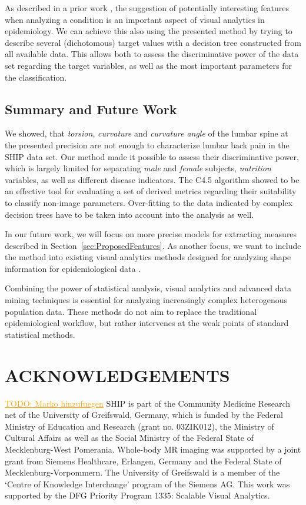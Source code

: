 \documentclass[a4paper,twoside]{style/article}
\newcommand{\com}[1]{\textcolor{orange}{\uline{#1}}}
\begin{document}
As described in a prior work \cite{Klemm2014VIS}, the suggestion of potentially interesting features when analyzing a condition is an important aspect of visual analytics in epidemiology.
We can achieve this also using the presented method by trying to describe several (dichotomous) target values with a decision tree constructed from all available data.
This allows both to assess the discriminative power of the data set regarding the target variables, as well as the most important parameters for the classification.

\subsection{Summary and Future Work}
\noindent We showed, that \emph{torsion}, \emph{curvature} and \emph{curvature angle} of the lumbar spine at the presented precision are not enough to characterize lumbar back pain in the SHIP data set.
Our method made it possible to assess their discriminative power, which is largely limited for separating \emph{male} and \emph{female} subjects, \emph{nutrition} variables, as well as different disease indicators.
The C4.5 algorithm showed to be an effective tool for evaluating a set of derived metrics regarding their suitability to classify non-image parameters.
Over-fitting to the data indicated by complex decision trees have to be taken into account into the analysis as well.

In our future work, we will focus on more precise models for extracting measures described in Section~\ref{sec:ProposedFeatures}.
As another focus, we want to include the method into existing visual analytics methods designed for analyzing shape information for epidemiological data \cite{Klemm2014VIS}.

Combining the power of statistical analysis, visual analytics and advanced data mining techniques is essential for analyzing increasingly complex heterogenous population data.
These methods do not aim to replace the traditional epidemiological workflow, but rather intervenes at the weak points of standard statistical methods.

\section*{\uppercase{Acknowledgements}}

\noindent \com{TODO: Marko hinzufuegen} SHIP is part of the Community Medicine Research net of the University of Greifswald, Germany, which is funded by the Federal Ministry of Education and Research (grant no. 03ZIK012), the Ministry of Cultural Affairs as well as the Social Ministry of the Federal State of Mecklenburg-West Pomerania. Whole-body MR imaging was supported by a joint grant from Siemens Healthcare, Erlangen, Germany and the Federal State of Mecklenburg-Vorpommern. The University of Greifswald is a member of the ‘Centre of Knowledge Interchange’ program of the Siemens AG. This work was supported by the DFG Priority Program 1335: Scalable Visual Analytics.
\end{document}
